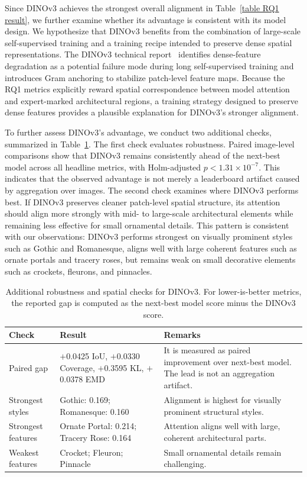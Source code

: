 \documentclass[lineno,pdflatex,sn-mathphys-num]{sn-jnl}%
\theoremstyle{thmstyleone}%
\theoremstyle{thmstyletwo}%
\theoremstyle{thmstylethree}%
\begin{document}
Since DINOv3 achieves the strongest overall alignment in Table~\ref{table RQ1 result}, we further examine whether its advantage is consistent with its model design. We hypothesize that DINOv3 benefits from the combination of large-scale self-supervised training and a training recipe intended to preserve dense spatial representations. The DINOv3 technical report~\cite{Simeoni26DINOv3} identifies dense-feature degradation as a potential failure mode during long self-supervised training and introduces Gram anchoring to stabilize patch-level feature maps. Because the RQ1 metrics explicitly reward spatial correspondence between model attention and expert-marked architectural regions, a training strategy designed to preserve dense features provides a plausible explanation for DINOv3's stronger alignment.

To further assess DINOv3's advantage, we conduct two additional checks, summarized in Table~\ref{table RQ1 dinov3}. The first check evaluates robustness. Paired image-level comparisons show that DINOv3 remains consistently ahead of the next-best model across all headline metrics, with Holm-adjusted $p < 1.31 \times 10^{-7}$. This indicates that the observed advantage is not merely a leaderboard artifact caused by aggregation over images. The second check examines where DINOv3 performs best. If DINOv3 preserves cleaner patch-level spatial structure, its attention should align more strongly with mid- to large-scale architectural elements while remaining less effective for small ornamental details. This pattern is consistent with our observations: DINOv3 performs strongest on visually prominent styles such as Gothic and Romanesque, aligns well with large coherent features such as ornate portals and tracery roses, but remains weak on small decorative elements such as crockets, fleurons, and pinnacles.

\begin{table}[!h]
\centering
\caption{Additional robustness and spatial checks for DINOv3. For lower-is-better metrics, the reported gap is computed as the next-best model score minus the DINOv3 score.\label{table RQ1 dinov3}}
\begin{tabular}{lp{}p{}}
\toprule
Check & Result & Remarks \\ \midrule
Paired gap & $+$0.0425 IoU, $+$0.0330 Coverage, $+$0.3595 KL, $+$0.0378 EMD & It is measured as paired improvement over next-best model. The lead is not an aggregation artifact. \\
Strongest styles & Gothic: 0.169; Romanesque: 0.160 & Alignment is highest for visually prominent structural styles. \\
Strongest features & Ornate Portal: 0.214; Tracery Rose: 0.164 & Attention aligns well with large, coherent architectural parts. \\
Weakest features & Crocket; Fleuron; Pinnacle & Small ornamental details remain challenging. \\
\bottomrule
\end{tabular}
\end{table}
\end{document}

